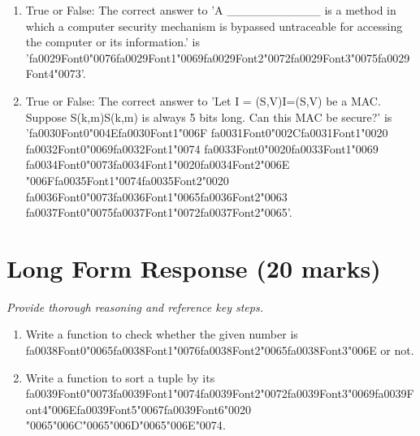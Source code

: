 \documentclass[12pt]{article}
\begin{document}
\begin{enumerate}[label=\arabic*.]
\item True or False: The correct answer to 'A \_\_\_\_\_\_\_\_\_\_\_ is a method in which a computer security mechanism is bypassed untraceable for accessing the computer or its information.' is '{\csname fa0029Font0\endcsname\char"0076}{\csname fa0029Font1\endcsname\char"0069}{\csname fa0029Font2\endcsname\char"0072}{\csname fa0029Font3\endcsname\char"0075}{\csname fa0029Font4\endcsname\char"0073}'.
\item True or False: The correct answer to 'Let I = (S,V)I=(S,V) be a MAC. Suppose S(k,m)S(k,m) is always 5 bits long. Can this MAC be secure?' is '{\csname fa0030Font0\endcsname\char"004E}{\csname fa0030Font1\endcsname\char"006F} {\csname fa0031Font0\endcsname\char"002C}{\csname fa0031Font1\endcsname\char"0020} {\csname fa0032Font0\endcsname\char"0069}{\csname fa0032Font1\endcsname\char"0074} {\csname fa0033Font0\endcsname\char"0020}{\csname fa0033Font1\endcsname\char"0069} {\csname fa0034Font0\endcsname\char"0073}{\csname fa0034Font1\endcsname\char"0020}{\csname fa0034Font2\endcsname\char"006E} {\char"006F}{\csname fa0035Font1\endcsname\char"0074}{\csname fa0035Font2\endcsname\char"0020} {\csname fa0036Font0\endcsname\char"0073}{\csname fa0036Font1\endcsname\char"0065}{\csname fa0036Font2\endcsname\char"0063} {\csname fa0037Font0\endcsname\char"0075}{\csname fa0037Font1\endcsname\char"0072}{\csname fa0037Font2\endcsname\char"0065}'.
\end{enumerate}

\section*{Long Form Response (20 marks)}
\textit{Provide thorough reasoning and reference key steps.}
\begin{enumerate}[label=\arabic*.]
\item Write a function to check whether the given number is {\csname fa0038Font0\endcsname\char"0065}{\csname fa0038Font1\endcsname\char"0076}{\csname fa0038Font2\endcsname\char"0065}{\csname fa0038Font3\endcsname\char"006E} or not.
\item Write a function to sort a tuple by its {\csname fa0039Font0\endcsname\char"0073}{\csname fa0039Font1\endcsname\char"0074}{\csname fa0039Font2\endcsname\char"0072}{\csname fa0039Font3\endcsname\char"0069}{\csname fa0039Font4\endcsname\char"006E}{\csname fa0039Font5\endcsname\char"0067}{\csname fa0039Font6\endcsname\char"0020} {\char"0065}{\char"006C}{\char"0065}{\char"006D}{\char"0065}{\char"006E}{\char"0074}.
\end{enumerate}
\end{document}
